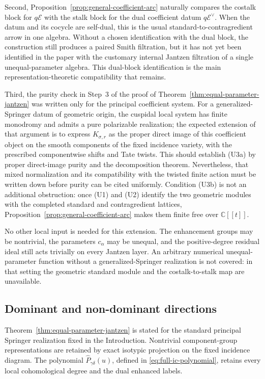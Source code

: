 \documentclass[10pt,a4paper]{amsart}
\begin{document}
Second, Proposition~\ref{prop:general-coefficient-arc} naturally compares
the costalk block for $q\mathcal E$ with the stalk block for the dual
coefficient datum $q\mathcal E^\vee$.  When the datum and its cocycle are
self-dual, this is the usual standard-to-contragredient arrow in one algebra.
Without a chosen identification with the dual block, the construction still
produces a paired Smith filtration, but it has not yet been identified in
the paper with the customary internal Jantzen filtration of a single
unequal-parameter algebra.  This dual-block identification is the main
representation-theoretic compatibility that remains.

Third, the purity check in Step~3 of the proof of
Theorem~\ref{thm:equal-parameter-jantzen} was written only for the principal coefficient
system.  For a generalized-Springer datum of geometric origin, the cuspidal
local system has finite monodromy and admits a pure polarizable realization;
the expected extension of that argument is to express
$K_{\sigma,r}$ as the proper direct image of this coefficient object on the
smooth components of the fixed incidence variety, with the prescribed
componentwise shifts and Tate twists.  This should establish (U3a) by proper
direct-image purity and the decomposition theorem.  Nevertheless, that
mixed normalization and its compatibility with
the twisted finite action must be written down before purity can be cited
uniformly.  Condition (U3b) is not an additional obstruction: once (U1) and
(U2) identify the two geometric modules with the completed standard and
contragredient lattices, Proposition~\ref{prop:general-coefficient-arc}
makes them finite free over $\mathbb C[[t]]$.

No other local input is needed for this extension.  The enhancement groups
may be nontrivial, the parameters $c_\alpha$ may be unequal, and the
positive-degree residual ideal still acts trivially on every Jantzen layer.
An arbitrary numerical unequal-parameter function without a
generalized-Springer realization is not covered: in that setting the
geometric standard module and the costalk-to-stalk map are unavailable.

\subsection{Dominant and non-dominant directions}

Theorem~\ref{thm:equal-parameter-jantzen} is stated for the standard principal Springer
realization fixed in the Introduction.  Nontrivial component-group
representations are retained by exact isotypic projection on the fixed
incidence diagram.  The polynomial
$\widehat P_{\gamma\delta}(u)$, defined in
\eqref{eq:full-ic-polynomial}, retains every local cohomological degree and
the dual enhanced labels.
\end{document}
